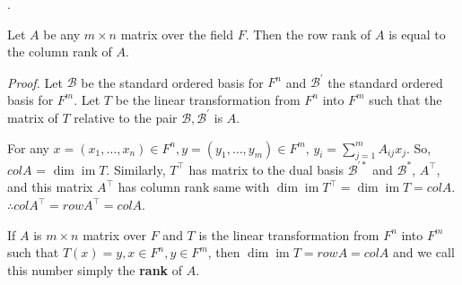 \documentclass[8pt]{beamer}
\newcommand{\mc}[1]{\mathcal{#1}}
\newcommand{\tb}[1]{\textbf{#1}}
\newcommand{\ti}[1]{\textit{#1}}
\newcommand{\im}{\operatorname{im}}
\begin{document}
\begin{frame}{.}
    \begin{theorem}
        Let $A$ be any $m\times n$ matrix over the field $F$.
        Then the row rank of $A$ is equal to the column rank of $A$.
    \end{theorem}
    \ti{Proof.}
    Let $\mc{B}$ be the standard ordered basis for $F^n$ and $\mc{B}^\prime$ the standard ordered basis for $F^m$.
    Let $T$ be the linear transformation from $F^n$ into $F^m$ such that the matrix of $T$ relative to the pair $\mc{B},\mc{B}^\prime$ is $A$.

    For any $x=(x_1, \dots, x_n) \in F^n, y = (y_1, \dots, y_m) \in F^m$, $y_i = \sum_{j=1}^m A_{ij} x_j$.
    So, $col A$ = $\dim \im T$.
    Similarly, $T^\top$ has matrix to the dual basis $\mc{B}^{\prime \ast}$ and $\mc{B}^\ast$, $A^\top$, and this matrix $A^\top$ has column rank same with $\dim \im T^\top = \dim \im T = col A$.
    $\therefore col A^\top = row A^\top = col A$.

    \begin{definition}
        If $A$ is $m \times n$ matrix over $F$ and $T$ is the linear transformation from $F^n$ into $F^m$ such that $T(x) = y, x\in F^n, y \in F^m$, then
        $\dim \im T = row A = col A$ and we call this number simply the \tb{rank} of $A$.
    \end{definition}
\end{frame}
\end{document}

